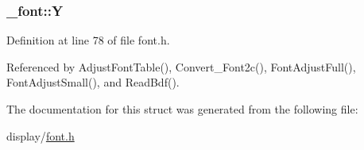 \hypertarget{struct__font_a3c9fee9cfcc713b1aac812c14dd9a36a}{
\subsubsection[{Y}]{ \-\_\-font\-::\-Y}}\label{struct__font_a3c9fee9cfcc713b1aac812c14dd9a36a}


Definition at line 78 of file font.\-h.



Referenced by Adjust\-Font\-Table(), Convert\-\_\-\-Font2c(), Font\-Adjust\-Full(), Font\-Adjust\-Small(), and Read\-Bdf().



The documentation for this struct was generated from the following file\-:\begin{DoxyCompactItemize}
\item 
display/\hyperlink{display_2font_8h}{font.\-h}\end{DoxyCompactItemize}
